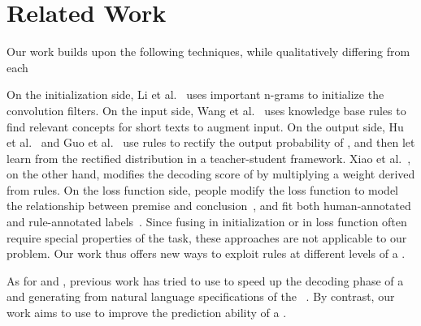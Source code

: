 \section{Related Work}
Our work builds upon the following techniques, while qualitatively differing from each

On the initialization side, Li et al.~ uses important n-grams to initialize the convolution filters.
On the input side, Wang et al.~ uses knowledge base rules to find relevant concepts for short texts to augment input.
On the output side,
Hu et al.~ and Guo et al.~ use \FOL rules to rectify the output probability of \NN, and then let \NN learn from the rectified distribution in a teacher-student framework.
Xiao et al.~, on the other hand, modifies the decoding score of \NN by multiplying a weight derived from rules.
On the loss function side, people modify the loss function to model the relationship between premise and conclusion~\cite{demeester2016lifted}, and fit both human-annotated and rule-annotated labels~\cite{alashkar2017examples}.
Since fusing in initialization or in loss function often require special properties of the task, these approaches are not applicable to our
problem. Our work thus offers new ways to exploit \RE rules at different levels of a \NN.

 As for \NNs and \REs, previous work has tried to use \RE to speed up the decoding phase of a
\NN~\cite{strauss2016regular} and generating \REs from natural language specifications of the \RE~\cite{locascio2016neural}. By contrast,
our work aims to use \REs to improve the prediction ability of a \NN.

